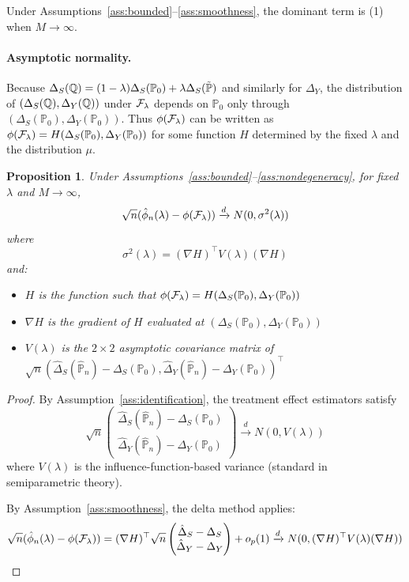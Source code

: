 \documentclass{article}
\newtheorem{proposition}{Proposition}
\newcommand{\PP}{\mathbb{P}}
\begin{document}
Under Assumptions~\ref{ass:bounded}--\ref{ass:smoothness}, the dominant term is
(1) when $M \to \infty$.

\paragraph{Asymptotic normality.}
Because $\Delta_S(\Q) = (1-\lambda)\Delta_S(\PP_0) + \lambda\Delta_S(\tilde{\PP})$ and similarly for $\Delta_Y$, the distribution of $(\Delta_S(\mathbb{Q}), \Delta_Y(\mathbb{Q}))$ under $\mathcal{F}_\lambda$ depends on $\PP_0$ only through $(\Delta_S(\PP_0), \Delta_Y(\PP_0))$. Thus $\phi(\mathcal{F}_\lambda)$ can be written as $\phi(\cF_\lambda) = H(\Delta_S(\PP_0), \Delta_Y(\PP_0))$ for some function $H$ determined by the fixed $\lambda$ and the distribution $\mu$.

\begin{proposition}\label{prop:asymptotic}
Under Assumptions~\ref{ass:bounded}--\ref{ass:nondegeneracy}, for fixed $\lambda$
and $M \to \infty$,
\[
    \sqrt{n}(\hat{\phi}_n(\lambda) - \phi(\mathcal{F}_\lambda))
    \xrightarrow{d} N(0, \sigma^2(\lambda))
\]
where
\[
    \sigma^2(\lambda) = (\nabla H)^\top V(\lambda) (\nabla H)
\]
and:
\begin{itemize}
    \item $H$ is the function such that $\phi(\cF_\lambda) = H(\Delta_S(\PP_0), \Delta_Y(\PP_0))$
    \item $\nabla H$ is the gradient of $H$ evaluated at $(\Delta_S(\PP_0), \Delta_Y(\PP_0))$
    \item $V(\lambda)$ is the $2 \times 2$ asymptotic covariance matrix of
          $\sqrt{n}(\hat{\Delta}_S(\hat{\PP}_n) - \Delta_S(\PP_0),
                    \hat{\Delta}_Y(\hat{\PP}_n) - \Delta_Y(\PP_0))^\top$
\end{itemize}
\end{proposition}

\begin{proof}
By Assumption~\ref{ass:identification}, the treatment effect estimators satisfy
\[
    \sqrt{n}\begin{pmatrix} \hat{\Delta}_S(\hat{\PP}_n) - \Delta_S(\PP_0) \\
                            \hat{\Delta}_Y(\hat{\PP}_n) - \Delta_Y(\PP_0)
    \end{pmatrix}
    \xrightarrow{d} N(0, V(\lambda))
\]
where $V(\lambda)$ is the influence-function-based variance (standard in
semiparametric theory).

By Assumption~\ref{ass:smoothness}, the delta method applies:
\[
    \sqrt{n}(\hat{\phi}_n(\lambda) - \phi(\mathcal{F}_\lambda))
    = (\nabla H)^\top \sqrt{n}\begin{pmatrix} \hat{\Delta}_S - \Delta_S \\
                                              \hat{\Delta}_Y - \Delta_Y
                      \end{pmatrix} + o_p(1)
    \xrightarrow{d} N(0, (\nabla H)^\top V(\lambda) (\nabla H))
\]
\end{proof}
\end{document}
